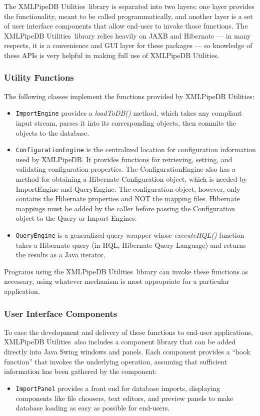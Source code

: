 \documentclass[10pt]{bmc_article}
\newenvironment{bmcformat}{\begin{raggedright}\baselineskip20pt\sloppy\setboolean{publ}{false}}{\end{raggedright}\baselineskip20pt\sloppy}
\def\xpdutils{XMLPipeDB Utilities}
\begin{document}
\begin{bmcformat}
The \xpdutils\ library is separated into two layers: one layer provides the functionality, meant to be called programmatically, and another layer is a set of user interface components that allow end-user to invoke those functions.  The \xpdutils\ library relies heavily on JAXB and Hibernate --- in many respects, it is a convenience and GUI layer for these packages --- so knowledge of these APIs is very helpful in making full use of \xpdutils.\pb

\subsubsection*{Utility Functions}

The following classes implement the functions provided by \xpdutils:
\begin{itemize}
\item \texttt{ImportEngine} provides a \emph{loadToDB()} method, which takes any compliant input stream, parses it into its corresponding objects, then commits the objects to the database.

\item \texttt{ConfigurationEngine} is the centralized location for configuration information used by XMLPipeDB.  It provides functions for retrieving, setting, and validating configuration properties. The ConfigurationEngine also has a method for obtaining a Hibernate Configuration object, which is needed by ImportEngine and QueryEngine. The configuration object, however, only contains the Hibernate properties and NOT the mapping files. Hibernate mappings must be added by the caller before passing the Configuration object to the Query or Import Engines.

\item \texttt{QueryEngine} is a generalized query wrapper whose \emph{executeHQL()} function takes a Hibernate query (in HQL, Hibernate Query Language) and returns the results as a Java iterator.
\end{itemize}
Programs using the \xpdutils\ library can invoke these functions as necessary, using whatever mechanism is most appropriate for a particular application.\pb

\subsubsection*{User Interface Components}

To ease the development and delivery of these functions to end-user applications, \xpdutils\ also includes a component library that can be added directly into Java Swing windows and panels.  Each component provides a ``hook function'' that invokes the underlying operation, assuming that sufficient information has been gathered by the component:
\begin{itemize}
\item \texttt{ImportPanel} provides a front end for database imports, displaying components like file choosers, text editors, and preview panels to make database loading as easy as possible for end-users.


\end{itemize}
\end{bmcformat}
\end{document}
